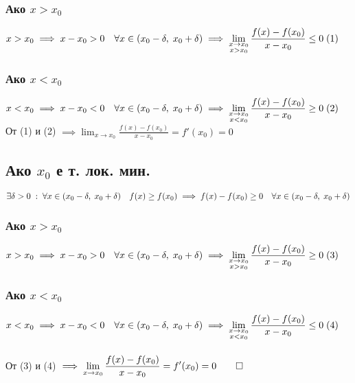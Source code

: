 \documentclass[12pt]{article}
\newcommand{\spc}{\quad}
\begin{document}
\subsubsection*{Ако \(x > x_0\)}
\(x > x_0 \implies x - x_0 > 0 \spc \forall x \in (x_0 - \delta, \; x_0 + \delta)\\\\
\implies \displaystyle\lim\limits_{\substack{x \to x_0 \\ x > x_0}} \frac{f(x) - f(x_0)}{x - x_0} \leq 0 \; (1)\)

\subsubsection*{Ако \(x < x_0\)}
\(x < x_0 \implies x - x_0 < 0 \spc \forall x \in (x_0 - \delta, \; x_0 + \delta)\\\\
\implies \displaystyle\lim\limits_{\substack{x \to x_0 \\ x < x_0}} \frac{f(x) - f(x_0)}{x - x_0} \geq 0 \; (2)\)\\

От (1) и (2) \(\implies \displaystyle\lim_{x \to x_0} \frac{f(x) - f(x_0)}{x - x_0} = f'(x_0) = 0\)

\subsection*{Ако \(x_0\) е т. лок. мин.}
\(\exists \delta > 0 \; : \; \forall x \in (x_0 - \delta, \; x_0 + \delta) \spc f(x) \geq f(x_0)\\\\
\implies f(x) - f(x_0) \geq 0 \spc \forall x \in (x_0 - \delta, \; x_0 + \delta)\)

\subsubsection*{Ако \(x > x_0\)}
\(x > x_0 \implies x - x_0 > 0 \spc \forall x \in (x_0 - \delta, \; x_0 + \delta)\\\\
\implies \displaystyle\lim\limits_{\substack{x \to x_0 \\ x > x_0}} \frac{f(x) - f(x_0)}{x - x_0} \geq 0 \; (3)\)

\subsubsection*{Ако \(x < x_0\)}
\(x < x_0 \implies x - x_0 < 0 \spc \forall x \in (x_0 - \delta, \; x_0 + \delta)\\\\
\implies \displaystyle\lim\limits_{\substack{x \to x_0 \\ x < x_0}} \frac{f(x) - f(x_0)}{x - x_0} \leq 0 \; (4) \)\\\\
От (3) и (4) \(\implies \displaystyle\lim_{x \to x_0} \frac{f(x) - f(x_0)}{x - x_0} = f'(x_0) = 0 \qed\)
\end{document}
